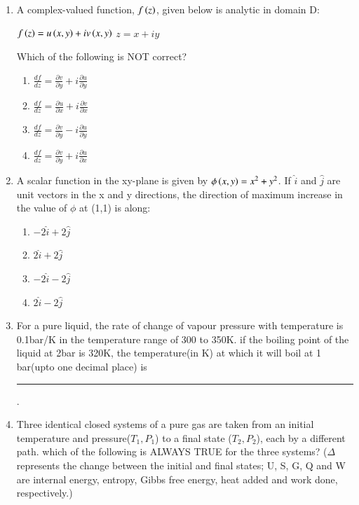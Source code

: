 \documentclass[journal,12pt,onecolumn]{IEEEtran}
\theoremstyle{remark}
\begin{document}
\begin{enumerate}
    \item A complex-valued function, $f\left(z\right)$, given below is analytic in domain D:

    $f\left(z\right)= u\left(x,y\right) + iv\left(x,y\right)$
    $z= x+iy$

    Which of the following is NOT correct?

\hfill{}
\begin{enumerate}
    \item $\frac{df}{dz} = \frac{\partial v}{\partial y}+ i\frac{\partial u}{\partial y}$
    \item $\frac{df}{dz} = \frac{\partial u}{\partial x}+ i\frac{\partial v}{\partial x} $
    \item $\frac{df}{dz} = \frac{\partial v}{\partial y}- i\frac{\partial u}{\partial y} $
    \item $\frac{df}{dz} = \frac{\partial v}{\partial y}+ i\frac{\partial u}{\partial x} $
\end{enumerate}

    \item A scalar function in the xy-plane is given by $\phi \left(x,y\right)= x^2  + y^2$. If $\hat{i}$ and $\hat{j}$ are unit vectors in the x and y directions, the direction of maximum increase in the value of $\phi$ at (1,1) is along:

\hfill{}
\begin{enumerate}
    \item $-2\hat{i}+ 2\hat{j}$
     \item $2\hat{i}+ 2\hat{j}$
      \item $-2\hat{i}- 2\hat{j}$
       \item $2\hat{i}- 2\hat{j}$
\end{enumerate}

    \item For a pure liquid, the rate of change of vapour pressure with temperature is 0.1bar/K in the temperature range of 300 to 350K. if the boiling point of the liquid at 2bar is 320K, the temperature(in K) at which it will boil at 1 bar(upto one decimal place) is \rule{40pt}{0.1mm}.

\hfill{}
    \item Three identical closed systems of a pure gas are taken from an initial temperature and pressure($T_1,P_1$) to a final state ($T_2, P_2$), each by a different path. which of the following is ALWAYS TRUE for the three systems? ($\Delta$ represents the change between the initial and final states; U, S, G, Q and W are internal energy, entropy, Gibbs free energy, heat added and work done, respectively.)


\end{enumerate}
\end{document}
